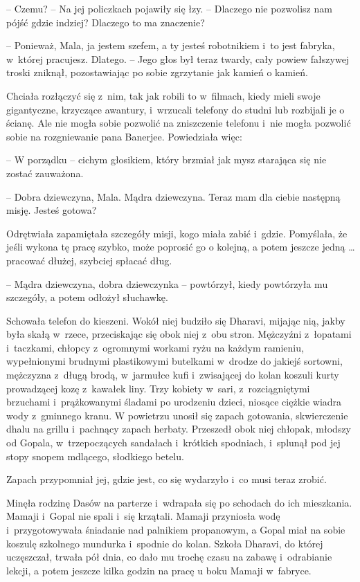 \documentclass[oneside,polish,11pt,rmheadings]{mwbk}
\begin{document}
-- Czemu? -- Na jej policzkach pojawiły się łzy. -- Dlaczego nie pozwolisz nam pójść gdzie indziej? Dlaczego to ma znaczenie? 


-- Ponieważ, Mala, ja jestem szefem, a ty jesteś robotnikiem i~to jest fabryka, w~której pracujesz. Dlatego. -- Jego głos był teraz twardy, cały powiew fałszywej troski zniknął, pozostawiając po sobie zgrzytanie jak kamień o kamień. 


Chciała rozłączyć się z~nim, tak jak robili to w~filmach, kiedy mieli swoje gigantyczne, krzyczące awantury, i~wrzucali telefony do studni lub rozbijali je o ścianę. Ale nie mogła sobie pozwolić na zniszczenie telefonu i~nie mogła pozwolić sobie na rozgniewanie pana Banerjee. Powiedziała więc: 

-- W porządku -- cichym głosikiem, który brzmiał jak mysz starająca się nie zostać zauważona. 


-- Dobra dziewczyna, Mala. Mądra dziewczyna. Teraz mam dla ciebie następną misję. Jesteś gotowa? 


Odrętwiała zapamiętała szczegóły misji, kogo miała zabić i~gdzie. Pomyślała, że jeśli wykona tę pracę szybko, może poprosić go o kolejną, a potem jeszcze jedną \ldots  pracować dłużej, szybciej spłacać dług. 


-- Mądra dziewczyna, dobra dziewczynka -- powtórzył, kiedy powtórzyła mu szczegóły, a potem odłożył słuchawkę. 


Schowała telefon do kieszeni. Wokół niej budziło się Dharavi, mijając nią, jakby była skałą w~rzece, przeciskając się obok niej z~obu stron. Mężczyźni z~łopatami i~taczkami, chłopcy z~ogromnymi workami ryżu na każdym ramieniu, wypełnionymi brudnymi plastikowymi butelkami w~drodze do jakiejś sortowni, mężczyzna z~długą brodą, w~jarmułce kufi i~zwisającej do kolan koszuli kurty prowadzącej kozę z~kawałek liny. Trzy kobiety w~sari, z~rozciągniętymi brzuchami i~prążkowanymi śladami po urodzeniu dzieci, niosące ciężkie wiadra wody z~gminnego kranu. W powietrzu unosił się zapach gotowania, skwierczenie dhalu na grillu i~pachnący zapach herbaty. Przeszedł obok niej chłopak, młodszy od Gopala, w~trzepoczących sandałach i~krótkich spodniach, i~splunął pod jej stopy snopem mdlącego, słodkiego betelu. 


Zapach przypomniał jej, gdzie jest, co się wydarzyło i~co musi teraz zrobić. 


Minęła rodzinę Dasów na parterze i~wdrapała się po schodach do ich mieszkania. Mamaji i~Gopal nie spali i~się krzątali. Mamaji przyniosła wodę i~przygotowywała śniadanie nad palnikiem propanowym, a Gopal miał na sobie koszulę szkolnego mundurka i~spodnie do kolan. Szkoła Dharavi, do której uczęszczał, trwała pół dnia, co dało mu trochę czasu na zabawę i~odrabianie lekcji, a potem jeszcze kilka godzin na pracę u boku Mamaji w~fabryce. 
\end{document}
